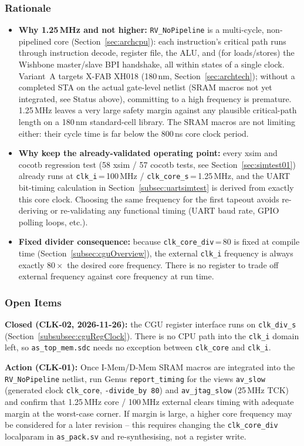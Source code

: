 \subsubsection{Rationale}

\begin{itemize}
  \item \textbf{Why 1.25\,MHz and not higher:} \texttt{RV\_NoPipeline} is a
    multi-cycle, non-pipelined core (Section~\ref{sec:archcpu}): each
    instruction's critical path runs through instruction decode, register
    file, the ALU, and (for loads/stores) the Wishbone master/slave BPI
    handshake, all within states of a single clock.
    Variant~A targets X-FAB XH018 (180\,nm, Section~\ref{sec:archtech}); without a completed STA on the actual
    gate-level netlist (SRAM macros not yet integrated, see Status above),
    committing to a high frequency is premature.
    1.25\,MHz leaves a very large safety margin against any plausible
    critical-path length on a 180\,nm standard-cell library.
    The SRAM macros are not limiting either: their cycle time is far below
    the 800\,ns core clock period.
  \item \textbf{Why keep the already-validated operating point:} every xsim
    and cocotb regression test (58 xsim / 57 cocotb tests, see
    Section~\ref{sec:simtest01}) already runs at \texttt{clk\_i}\,=\,100\,MHz
    / \texttt{clk\_core\_s}\,=\,1.25\,MHz, and the UART bit-timing
    calculation in Section~\ref{subsec:uartsimtest} is derived from exactly
    this core clock.
    Choosing the same frequency for the first tapeout avoids re-deriving or
    re-validating any functional timing (UART baud rate, GPIO polling loops,
    etc.).
  \item \textbf{Fixed divider consequence:} because \texttt{clk\_core\_div}\,=\,80
    is fixed at compile time (Section~\ref{subsec:cguOverview}), the external
    \texttt{clk\_i} frequency is always exactly $80\times$ the desired core
    frequency.
    There is no register to trade off external frequency against core
    frequency at run time.
\end{itemize}

\subsubsection{Open Items}

\textbf{Closed (CLK-02, 2026-11-26):} the CGU register interface runs on
\texttt{clk\_div\_s} (Section~\ref{subsubsec:cguRegClock}). There is no
CPU path into the \texttt{clk\_i} domain left, so \texttt{as\_top\_mem.sdc}
needs no exception between \texttt{clk\_core} and \texttt{clk\_i}.

\textbf{Action (CLK-01):} Once I-Mem/D-Mem SRAM macros are integrated into
the \texttt{RV\_NoPipeline} netlist, run Genus \texttt{report\_timing} for the views \texttt{av\_slow}
(generated clock \texttt{clk\_core}, \texttt{-divide\_by 80}) and
\texttt{av\_jtag\_slow} (25\,MHz TCK) and
confirm that 1.25\,MHz core / 100\,MHz external clears timing with adequate
margin at the worst-case corner.
If margin is large, a higher core frequency may be considered for a later
revision -- this requires changing the \texttt{clk\_core\_div} localparam in
\texttt{as\_pack.sv} and re-synthesising, not a register write.
